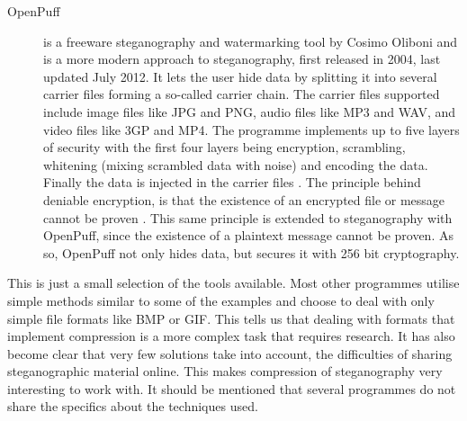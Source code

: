 \begin{description}
	\item[OpenPuff] is a freeware steganography and watermarking tool by Cosimo Oliboni and is a more modern approach to steganography, first released in 		2004, last updated July 2012.
	It lets the user hide data by splitting it into several carrier files forming a so-called carrier chain.
	The carrier files supported include image files like JPG and PNG, audio files like MP3 and WAV, and video files like 3GP and MP4.
	The programme implements up to five layers of security with the first four layers being encryption, scrambling, whitening (mixing scrambled data with noise) and encoding the data.
	Finally the data is injected in the carrier files \citep{Oliboni2012}.
	The principle behind deniable encryption, is that the existence of an encrypted file or message cannot be proven \citep{Schneier2008}.
	This same principle is extended to steganography with OpenPuff, since the existence of a plaintext message cannot be proven.
	As so, OpenPuff not only hides data, but secures it with 256 bit cryptography.
\end{description}

\noindent This is just a small selection of the tools available.
Most other programmes utilise simple methods similar to some of the examples and choose to deal with only simple file formats like BMP or GIF.
This tells us that dealing with formats that implement compression is a more complex task that requires research.
It has also become clear that very few solutions take into account, the difficulties of sharing steganographic material online.
This makes compression of steganography very interesting to work with.
It should be mentioned that several programmes do not share the specifics about the techniques used.

